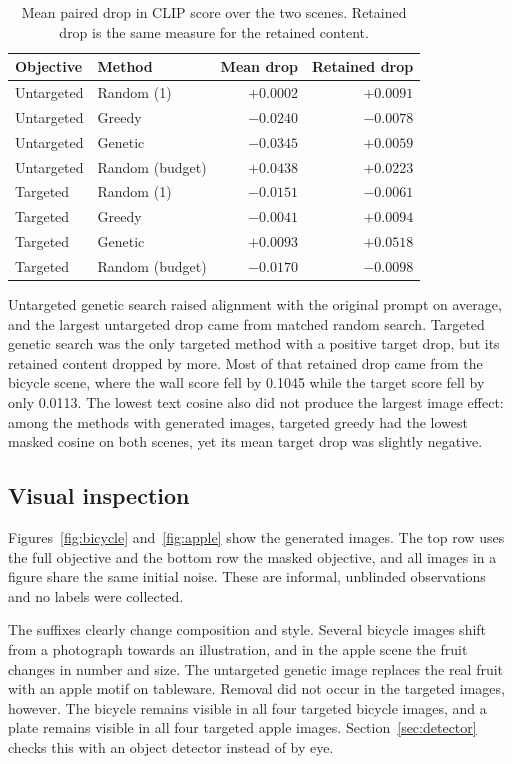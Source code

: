\documentclass[11pt]{article}
\begin{document}
\begin{table}[htbp]
\centering
\small
\caption{Mean paired drop in CLIP score over the two scenes. Retained drop is the same measure for the retained content.}
\label{tab:image-scores}
\begin{tabular}{@{}llrr@{}}
\toprule
\textbf{Objective} & \textbf{Method} & \textbf{Mean drop} & \textbf{Retained drop} \\
\midrule
Untargeted & Random (1) & $+0.0002$ & $+0.0091$ \\
Untargeted & Greedy & $-0.0240$ & $-0.0078$ \\
Untargeted & Genetic & $-0.0345$ & $+0.0059$ \\
Untargeted & Random (budget) & $+0.0438$ & $+0.0223$ \\
\addlinespace
Targeted & Random (1) & $-0.0151$ & $-0.0061$ \\
Targeted & Greedy & $-0.0041$ & $+0.0094$ \\
Targeted & Genetic & $+0.0093$ & $+0.0518$ \\
Targeted & Random (budget) & $-0.0170$ & $-0.0098$ \\
\bottomrule
\end{tabular}
\end{table}

Untargeted genetic search raised alignment with the original prompt on average, and the largest untargeted drop came from matched random search. Targeted genetic search was the only targeted method with a positive target drop, but its retained content dropped by more. Most of that retained drop came from the bicycle scene, where the wall score fell by 0.1045 while the target score fell by only 0.0113. The lowest text cosine also did not produce the largest image effect: among the methods with generated images, targeted greedy had the lowest masked cosine on both scenes, yet its mean target drop was slightly negative.

\subsection{Visual inspection}

Figures~\ref{fig:bicycle} and~\ref{fig:apple} show the generated images. The top row uses the full objective and the bottom row the masked objective, and all images in a figure share the same initial noise. These are informal, unblinded observations and no labels were collected.

The suffixes clearly change composition and style. Several bicycle images shift from a photograph towards an illustration, and in the apple scene the fruit changes in number and size. The untargeted genetic image replaces the real fruit with an apple motif on tableware. Removal did not occur in the targeted images, however. The bicycle remains visible in all four targeted bicycle images, and a plate remains visible in all four targeted apple images. Section~\ref{sec:detector} checks this with an object detector instead of by eye.
\end{document}
